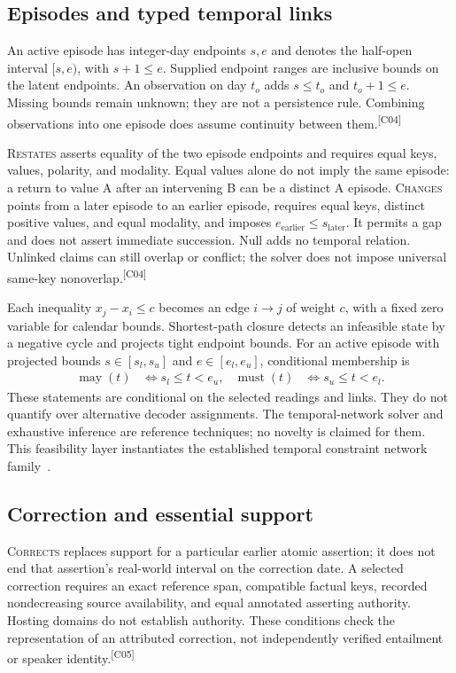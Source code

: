 \documentclass[10pt,letterpaper]{article}
\newcommand{\claim}[1]{\textsuperscript{\scriptsize[#1]}}
\begin{document}
\subsection{Episodes and typed temporal links}
\label{sec:temporal}
An active episode has integer-day endpoints $s,e$ and denotes the half-open
interval $[s,e)$, with $s+1\leq e$. Supplied endpoint ranges are inclusive bounds
on the latent endpoints. An observation on day $t_o$ adds
$s\leq t_o$ and $t_o+1\leq e$. Missing bounds remain unknown; they are not a
persistence rule. Combining observations into one episode does assume
continuity between them.\claim{C04}

\textsc{Restates} asserts equality of the two episode endpoints and requires
equal keys, values, polarity, and modality. Equal values alone do not imply the
same episode: a return to value A after an intervening B can be a distinct A
episode. \textsc{Changes} points from a later episode to an earlier episode,
requires equal keys, distinct positive values, and equal modality, and imposes
$e_{\mathrm{earlier}}\leq s_{\mathrm{later}}$. It permits a gap and does not
assert immediate succession. Null adds no temporal relation. Unlinked claims
can still overlap or conflict; the solver does not impose universal same-key
nonoverlap.\claim{C04}

Each inequality $x_j-x_i\leq c$ becomes an edge $i\to j$ of weight $c$, with a
fixed zero variable for calendar bounds. Shortest-path closure detects an
infeasible state by a negative cycle and projects tight endpoint bounds.
For an active episode with projected bounds
$s\in[s_l,s_u]$ and $e\in[e_l,e_u]$, conditional membership is
\begin{align}
\operatorname{may}(t)&\iff s_l\leq t<e_u, &
\operatorname{must}(t)&\iff s_u\leq t<e_l. \label{eq:membership}
\end{align}
These statements are conditional on the selected readings and links. They do
not quantify over alternative decoder assignments. The temporal-network solver
and exhaustive inference are reference techniques; no novelty is claimed for
them. This feasibility layer instantiates the established temporal constraint
network family~\cite{dechter1991temporal}.

\subsection{Correction and essential support}
\label{sec:correction}
\textsc{Corrects} replaces support for a particular earlier atomic assertion;
it does not end that assertion's real-world interval on the correction date.
A selected correction requires an exact reference span, compatible factual
keys, recorded nondecreasing source availability, and equal annotated asserting
authority. Hosting domains do not establish authority. These conditions check
the representation of an attributed correction, not independently verified
entailment or speaker identity.\claim{C05}
\end{document}
